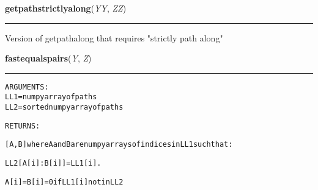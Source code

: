    \label{System:Utils:getpathstrictlyalong}

    \vspace{0.5ex}

\hspace{.8\funcindent}\begin{boxedminipage}{\funcwidth}

    \raggedright \textbf{getpathstrictlyalong}(\textit{YY}, \textit{ZZ})

    \vspace{-1.5ex}

    \rule{\textwidth}{0.5\fboxrule}
\setlength{\parskip}{2ex}
    Version of getpathalong that requires "strictly path along"

\setlength{\parskip}{1ex}
    \end{boxedminipage}

    \label{System:Utils:fastequalspairs}

    \vspace{0.5ex}

\hspace{.8\funcindent}\begin{boxedminipage}{\funcwidth}

    \raggedright \textbf{fastequalspairs}(\textit{Y}, \textit{Z})

    \vspace{-1.5ex}

    \rule{\textwidth}{0.5\fboxrule}
\setlength{\parskip}{2ex}
\begin{alltt}


ARGUMENTS:
        LL1 = numpy array of paths
        LL2 = sorted numpy array of paths

RETURNS:

[A,B] where A and B are numpy arrays of indices in LL1 such that:
        
        LL2[A[i]:B[i]] = LL1[i].   
        
A[i] = B[i] = 0 if LL1[i] not in LL2
\end{alltt}

\setlength{\parskip}{1ex}
    \end{boxedminipage}

    \label{System:Utils:ModContents}

